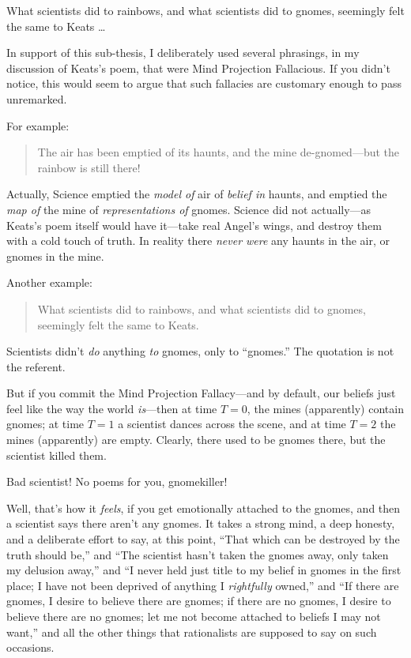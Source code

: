 {
 What scientists did to rainbows, and what scientists did to
gnomes, seemingly felt the same to Keats \ldots}

{
 In support of this sub-thesis, I deliberately used several
phrasings, in my discussion of Keats's poem, that were
Mind Projection Fallacious. If you didn't notice, this
would seem to argue that such fallacies are customary enough to pass
unremarked.}

{
 For example:}

\begin{quote}
{
 The air has been emptied of its haunts, and the mine
 de-gnomed---but the rainbow is still there!}
\end{quote}

{
 Actually, Science emptied the \textit{model of} air of
\textit{belief in} haunts, and emptied the \textit{map of} the mine of
\textit{representations of} gnomes. Science did not actually---as
Keats's poem itself would have it---take real
Angel's wings, and destroy them with a cold touch of
truth. In reality there \textit{never were} any haunts in the air, or
gnomes in the mine.}

{
 Another example:}

\begin{quote}
{
 What scientists did to rainbows, and what scientists did to
 gnomes, seemingly felt the same to Keats.}
\end{quote}

{
 Scientists didn't \textit{do} anything \textit{to}
gnomes, only to ``gnomes.'' The
quotation is not the referent.}

{
 But if you commit the Mind Projection Fallacy---and by default,
our beliefs just feel like the way the world \textit{is}{}---then at
time $T = 0$, the mines (apparently) contain gnomes; at time $T = 1$ a
scientist dances across the scene, and at time $T = 2$ the mines
(apparently) are empty. Clearly, there used to be gnomes there, but the
scientist killed them.}

{
 Bad scientist! No poems for you, gnomekiller!}

{
 Well, that's how it \textit{feels}, if you get
emotionally attached to the gnomes, and then a scientist says there
aren't any gnomes. It takes a strong mind, a deep
honesty, and a deliberate effort to say, at this point,
``That which can be destroyed by the truth should
be,'' and ``The scientist
hasn't taken the gnomes away, only taken my delusion
away,'' and ``I never held just
title to my belief in gnomes in the first place; I have not been
deprived of anything I \textit{rightfully} owned,''
and ``If there are gnomes, I desire to believe there
are gnomes; if there are no gnomes, I desire to believe there are no
gnomes; let me not become attached to beliefs I may not
want,'' and all the other things that rationalists
are supposed to say on such occasions.}

